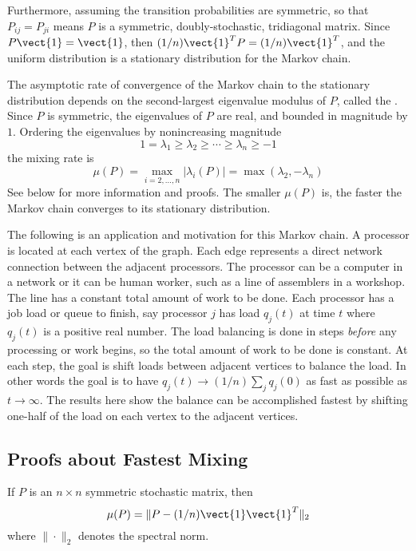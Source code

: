 \documentclass[12pt]{article}
\begin{document}
Furthermore, assuming the transition probabilities are symmetric, so
that \( P_{ij} = P_{ji} \) means \( P \) is a symmetric,
doubly-stochastic, tridiagonal matrix.  Since \( P \vect {1} = \vect{1} \),
then \( (1/n) \vect{1}^T P = (1/n) \vect{1}^T \), and the uniform
distribution is a stationary distribution for the Markov chain.

The asymptotic rate of convergence of the Markov chain to the stationary
distribution depends on the second-largest eigenvalue modulus of \( P \),
called the .%
Since \( P \) is symmetric, the eigenvalues of \( P \) are real, and
bounded in magnitude by \( 1 \).  Ordering the eigenvalues by
nonincreasing magnitude
\[
    1 = \lambda_1 \ge \lambda_2 \ge \cdots \ge \lambda_n \ge -1
\] the mixing rate is
\[
    \mu(P) = \max_{i=2,\dots,n} | \lambda_i(P) | = \max(\lambda_2, -\lambda_n)
\] See below for more information and proofs.  The smaller \( \mu(P) \)
is, the faster the Markov chain converges to its stationary
distribution.

The following is an application and motivation for this Markov chain. A
processor is located at each vertex of the graph.  Each edge represents
a direct network connection between the adjacent processors. The
processor can be a computer in a network or it can be human worker, such
as a line of assemblers in a workshop.  The line has a constant total
amount of work to be done.  Each processor has a job load or queue to
finish, say processor \( j \) has load \( q_j (t) \) at time \( t \)
where \( q_j(t) \) is a positive real number.  The load balancing is
done in steps \emph{before} any processing or work begins, so the total
amount of work to be done is constant.  At each step, the goal is shift
loads between adjacent vertices to balance the load.  In other words the
goal is to have \( q_j(t) \to (1/n) \sum_j q_{j}(0) \) as fast as
possible as \( t \to \infty \).  The results here show the balance can
be accomplished fastest by shifting one-half of the load on each vertex
to the adjacent vertices.

\subsection*{Proofs about Fastest Mixing }

\begin{lemma}
    \label{fastestmixing:lemma:one} If \( P \) is an \( n \times n \)
    symmetric stochastic matrix, then
    \[
        \mu(P) = \| P - (1/n) \vect{1}\vect{1}^T \|_2
    \] where \( \| \cdot \|_2 \) denotes the spectral norm.
\end{lemma}
\end{document}
